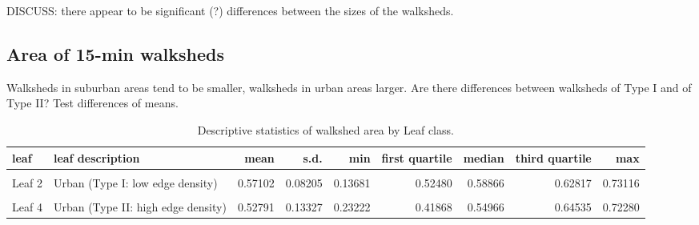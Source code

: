 \documentclass[preprint, 3p,
authoryear]{elsarticle} %
\begin{document}
DISCUSS: there appear to be significant (?) differences between the
sizes of the walksheds.

\subsection{Area of 15-min walksheds}\label{area-of-15-min-walksheds}

Walksheds in suburban areas tend to be smaller, walksheds in urban areas
larger. Are there differences between walksheds of Type I and of Type
II? Test differences of means.

\begingroup\fontsize{7}{9}\selectfont

\begin{longtable}[t]{llrrrrrrr}
\caption{\label{tab:walkshed-area-by-leaf}\label{tab:skim-of-area}Descriptive statistics of walkshed area by Leaf class.}\\
\toprule
leaf & leaf description & mean & s.d. & min & first quartile & median & third quartile & max\\
\midrule
\cellcolor{gray!10}{Leaf 1} & \cellcolor{gray!10}{Suburban (Type I: low edge density)} & \cellcolor{gray!10}{0.50306} & \cellcolor{gray!10}{0.07392} & \cellcolor{gray!10}{0.30974} & \cellcolor{gray!10}{0.45472} & \cellcolor{gray!10}{0.51397} & \cellcolor{gray!10}{0.55072} & \cellcolor{gray!10}{0.67990}\\
Leaf 2 & Urban (Type I: low edge density) & 0.57102 & 0.08205 & 0.13681 & 0.52480 & 0.58866 & 0.62817 & 0.73116\\
\cellcolor{gray!10}{Leaf 3} & \cellcolor{gray!10}{Suburban (Type II: high edge density)} & \cellcolor{gray!10}{0.41292} & \cellcolor{gray!10}{0.11270} & \cellcolor{gray!10}{0.05607} & \cellcolor{gray!10}{0.33932} & \cellcolor{gray!10}{0.41946} & \cellcolor{gray!10}{0.49331} & \cellcolor{gray!10}{0.66563}\\
Leaf 4 & Urban (Type II: high edge density) & 0.52791 & 0.13327 & 0.23222 & 0.41868 & 0.54966 & 0.64535 & 0.72280\\
\bottomrule
\end{longtable}
\endgroup{}
\end{document}
